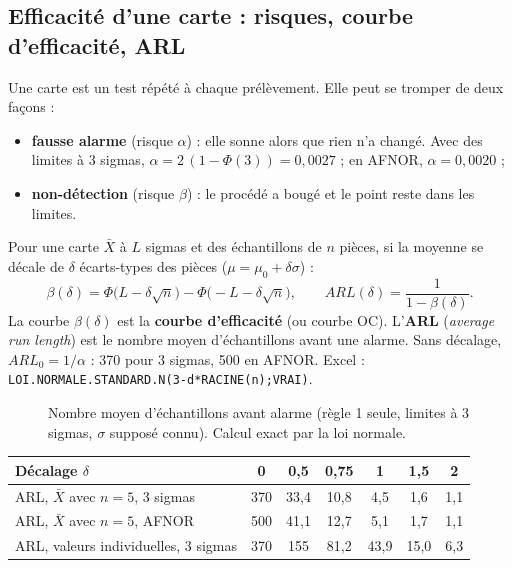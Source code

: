 \documentclass[11pt,a4paper]{article}
\newcommand{\xl}[1]{\texttt{\small #1}}
\begin{document}
\subsection{Efficacité d'une carte : risques, courbe d'efficacité, ARL}\label{sec:arl}
Une carte est un test répété à chaque prélèvement. Elle peut se tromper de deux façons :
\begin{itemize}[nosep]
\item \textbf{fausse alarme} (risque $\alpha$) : elle sonne alors que rien n'a changé. Avec des limites à 3 sigmas, $\alpha=2\,(1-\Phi(3))=0{,}0027$ ; en AFNOR, $\alpha=0{,}0020$ ;
\item \textbf{non-détection} (risque $\beta$) : le procédé a bougé et le point reste dans les limites.
\end{itemize}
Pour une carte $\bar X$ à $L$ sigmas et des échantillons de $n$ pièces, si la moyenne se décale de $\delta$ écarts-types des pièces ($\mu=\mu_0+\delta\sigma$) :
\[
\beta(\delta)=\Phi\big(L-\delta\sqrt n\big)-\Phi\big(-L-\delta\sqrt n\big),\qquad ARL(\delta)=\frac1{1-\beta(\delta)} .
\]
La courbe $\beta(\delta)$ est la \textbf{courbe d'efficacité} (ou courbe OC). L'\textbf{ARL} (\emph{average run length}) est le nombre moyen d'échantillons avant une alarme. Sans décalage, $ARL_0=1/\alpha$ : 370 pour 3 sigmas, 500 en AFNOR. Excel : \xl{LOI.NORMALE.STANDARD.N(3-d*RACINE(n);VRAI)}.

\begin{figure}[h]
\centering
{}
\caption{Nombre moyen d'échantillons avant alarme (règle 1 seule, limites à 3 sigmas, $\sigma$ supposé connu). Calcul exact par la loi normale.}
\end{figure}

\begin{center}\small
\begin{tabular}{@{}lcccccc@{}}\toprule
Décalage $\delta$ & 0 & 0,5 & 0,75 & 1 & 1,5 & 2\\\midrule
ARL, $\bar X$ avec $n=5$, 3 sigmas & 370 & 33,4 & 10,8 & 4,5 & 1,6 & 1,1\\
ARL, $\bar X$ avec $n=5$, AFNOR & 500 & 41,1 & 12,7 & 5,1 & 1,7 & 1,1\\
ARL, valeurs individuelles, 3 sigmas & 370 & 155 & 81,2 & 43,9 & 15,0 & 6,3\\\bottomrule
\end{tabular}
\end{center}
\end{document}
